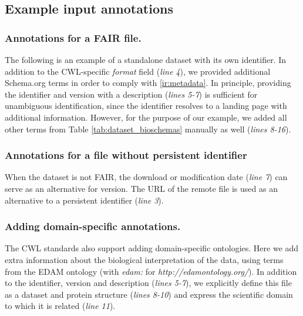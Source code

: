\onecolumn
\subsection{Example input annotations}
\label{sec:sup_example_annotations}

\subsubsection{Annotations for a FAIR file.}
\label{sec:annot_fair}
The following is an example of a standalone dataset with its own identifier. In addition to the CWL-specific \emph{format} field (\emph{line 4}), we provided additional Schema.org terms in order to comply with \ref{ir:metadata}. In principle, providing the identifier and version with a description (\emph{lines 5-7}) is sufficient for unambiguous identification, since the identifier resolves to a landing page with additional information. However, for the purpose of our example, we added all other terms from Table \ref{tab:dataset_bioschemas} manually as well (\emph{lines 8-16}).



\subsubsection{Annotations for a file without persistent identifier} \label{sec:annot_nonfair}

When the dataset is not FAIR, the download or modification date (\emph{line 7}) can serve as an alternative for version. The URL of the remote file is used as an alternative to a persistent identifier (\emph{line 3}).




\subsubsection{Adding domain-specific annotations.}

The CWL standards also support adding domain-specific ontologies. Here we add extra information about the biological interpretation of the data, using terms from the EDAM ontology (with \emph{edam:} for  \emph{http://edamontology.org/}). In addition to the identifier, version and description (\emph{lines 5-7}), we explicitly define this file as a dataset and protein structure (\emph{lines 8-10}) and express the scientific domain to which it is related (\emph{line 11}). 

